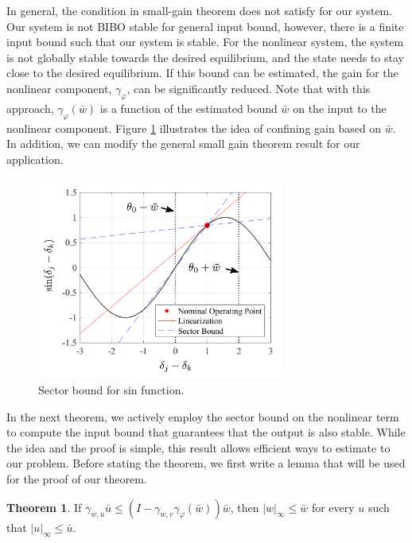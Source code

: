 \documentclass[journal]{IEEEtran}
\theoremstyle{definition}
\newtheorem{theorem}{Theorem}
\begin{document}
In general, the condition in small-gain theorem does not satisfy for our system. Our system is not BIBO stable for general input bound, however, there is a finite input bound such that our system is stable. For the nonlinear system, the system is not globally stable towards the desired equilibrium, and the state needs to stay close to the desired equilibrium. If this bound can be estimated, the gain for the nonlinear component, $\gamma_\varphi$, can be significantly reduced. Note that with this approach, $\gamma_\varphi(\bar{w})$ is a function of the estimated bound $\bar{w}$ on the input to the nonlinear component. Figure \ref{fig_sector_bound_cos} illustrates the idea of confining gain based on $\bar{w}$. In addition, we can modify the general small gain theorem result for our application.

\begin{figure}[!htbp]
	\centering
	\includegraphics[width=3.2in]{picture/sector_bound_cos.png}
	\caption{Sector bound for sin function.}
	\label{fig_sector_bound_cos}
\end{figure}

In the next theorem, we actively employ the sector bound on the nonlinear term to compute the input bound that guarantees that the output is also stable. While the idea and the proof is simple, this result allows efficient ways to estimate to our problem. Before stating the theorem, we first write a lemma that will be used for the proof of our theorem.

\begin{theorem}
If $\gamma_{w,u}\bar{u}\leq(I-\gamma_{w,v}\gamma_\varphi(\bar{w}))\bar{w}$, then $|w|_\infty\leq\bar{w}$ for every $u$ such that $|u|_\infty\leq\bar{u}$.
\label{theorem_main}
\end{theorem}
\end{document}
